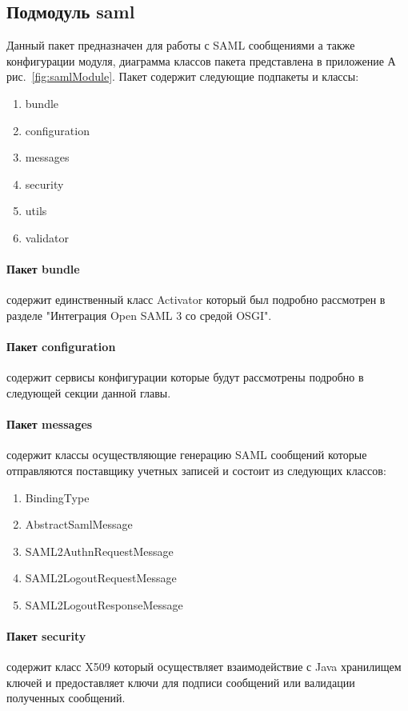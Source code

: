\subsection{Подмодуль saml} 
Данный пакет предназначен для работы с SAML сообщениями а также конфигурации модуля, диаграмма классов пакета представлена в приложение А рис.~\ref{fig:samlModule}. Пакет содержит следующие подпакеты и классы:
\begin{enumerate}
\item bundle
\item configuration
\item messages
\item security
\item utils
\item validator
\end{enumerate}

\paragraph{Пакет bundle} содержит единственный класс Activator который был подробно рассмотрен в разделе "Интеграция Open SAML 3 со средой OSGI".
\paragraph{Пакет configuration} содержит сервисы конфигурации которые будут рассмотрены подробно в следующей секции данной главы.
\paragraph{Пакет messages} содержит классы осуществляющие генерацию SAML сообщений которые отправляются поставщику учетных записей и состоит из следующих классов:
\begin{enumerate}
\item BindingType
\item AbstractSamlMessage
\item SAML2AuthnRequestMessage
\item SAML2LogoutRequestMessage
\item SAML2LogoutResponseMessage
\end{enumerate}
\paragraph{Пакет security} содержит класс X509 который осуществляет взаимодействие с Java хранилищем ключей и предоставляет ключи для подписи сообщений или валидации полученных сообщений.
